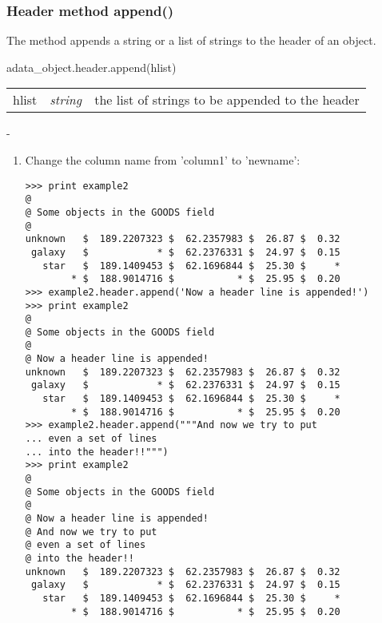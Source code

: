 \subsubsection{Header method append()}
\label{ahe_append}
The method appends a string or a list of strings to the header
of an \ad object.

adata\_object.header.append(hlist)

\begin{tabular}{lcl}
hlist &{\it string}& the list of strings to be appended to the header\\
\end{tabular}

-

\begin{enumerate}
\item Change the column name from 'column1' to 'newname':
\begin{small}
\begin{verbatim}
>>> print example2
@
@ Some objects in the GOODS field
@
unknown   $  189.2207323 $  62.2357983 $  26.87 $  0.32
 galaxy   $            * $  62.2376331 $  24.97 $  0.15
   star   $  189.1409453 $  62.1696844 $  25.30 $     *
        * $  188.9014716 $           * $  25.95 $  0.20
>>> example2.header.append('Now a header line is appended!')
>>> print example2
@
@ Some objects in the GOODS field
@
@ Now a header line is appended!
unknown   $  189.2207323 $  62.2357983 $  26.87 $  0.32
 galaxy   $            * $  62.2376331 $  24.97 $  0.15
   star   $  189.1409453 $  62.1696844 $  25.30 $     *
        * $  188.9014716 $           * $  25.95 $  0.20
>>> example2.header.append("""And now we try to put
... even a set of lines
... into the header!!""")
>>> print example2
@
@ Some objects in the GOODS field
@
@ Now a header line is appended!
@ And now we try to put
@ even a set of lines
@ into the header!!
unknown   $  189.2207323 $  62.2357983 $  26.87 $  0.32
 galaxy   $            * $  62.2376331 $  24.97 $  0.15
   star   $  189.1409453 $  62.1696844 $  25.30 $     *
        * $  188.9014716 $           * $  25.95 $  0.20
\end{verbatim}
\end{small}
\end{enumerate}
